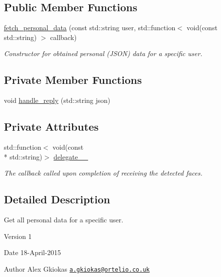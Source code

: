 \subsection*{Public Member Functions}
\begin{DoxyCompactItemize}
\item 
\hyperlink{classrapp_1_1cloud_1_1fetch__personal__data_a1f2d7d03b374530100e20a1d3956f23b}{fetch\-\_\-personal\-\_\-data} (const std\-::string user, std\-::function$<$ void(const std\-::string) $>$ callback)
\begin{DoxyCompactList}\small\item\em Constructor for obtained personal (J\-S\-O\-N) data for a specific user. \end{DoxyCompactList}\end{DoxyCompactItemize}
\subsection*{Private Member Functions}
\begin{DoxyCompactItemize}
\item 
void \hyperlink{classrapp_1_1cloud_1_1fetch__personal__data_a92a1b53a0081f859e11ea99b7aa7bb2e}{handle\-\_\-reply} (std\-::string json)
\end{DoxyCompactItemize}
\subsection*{Private Attributes}
\begin{DoxyCompactItemize}
\item 
std\-::function$<$ void(const \\*
std\-::string)$>$ \hyperlink{classrapp_1_1cloud_1_1fetch__personal__data_afbc83d44148dd79a0abb8c8f55351305}{delegate\-\_\-\-\_\-}
\begin{DoxyCompactList}\small\item\em The callback called upon completion of receiving the detected faces. \end{DoxyCompactList}\end{DoxyCompactItemize}


\subsection{Detailed Description}
Get all personal data for a specific user. 

\begin{DoxyVersion}{Version}
1 
\end{DoxyVersion}
\begin{DoxyDate}{Date}
18-\/\-April-\/2015 
\end{DoxyDate}
\begin{DoxyAuthor}{Author}
Alex Gkiokas \href{mailto:a.gkiokas@ortelio.co.uk}{\tt a.\-gkiokas@ortelio.\-co.\-uk} 
\end{DoxyAuthor}


